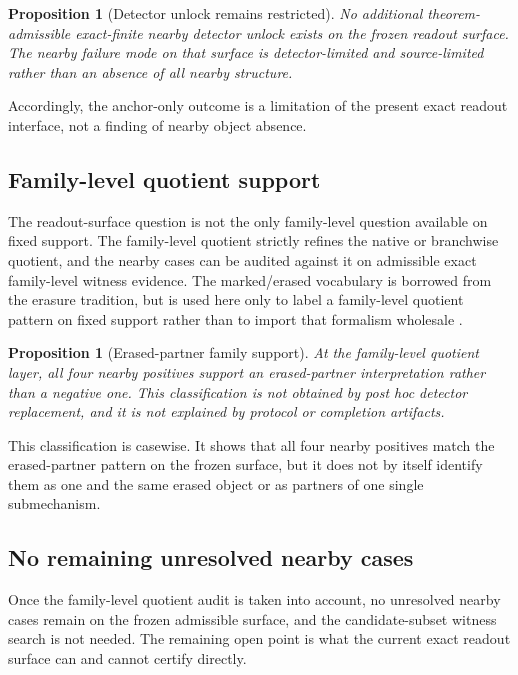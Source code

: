\documentclass[11pt]{article}
\newtheorem{proposition}[theorem]{Proposition}
\theoremstyle{definition}
\begin{document}
\begin{proposition}[Detector unlock remains restricted]
\label{prop:nearby-detector-restricted}
No additional theorem-admissible exact-finite nearby detector unlock exists on the frozen readout surface. The nearby failure mode on that surface is detector-limited and source-limited rather than an absence of all nearby structure.
\end{proposition}

Accordingly, the anchor-only outcome is a limitation of the present exact readout interface, not a finding of nearby object absence.

\subsection{Family-level quotient support}

The readout-surface question is not the only family-level question available on fixed support. The family-level quotient strictly refines the native or branchwise quotient, and the nearby cases can be audited against it on admissible exact family-level witness evidence. The marked/erased vocabulary is borrowed from the erasure tradition, but is used here only to label a family-level quotient pattern on fixed support rather than to import that formalism wholesale \cite{ScullyDruhl1982}.

\begin{proposition}[Erased-partner family support]
\label{prop:nearby-erased-partner}
At the family-level quotient layer, all four nearby positives support an erased-partner interpretation rather than a negative one. This classification is not obtained by post hoc detector replacement, and it is not explained by protocol or completion artifacts.
\end{proposition}

This classification is casewise. It shows that all four nearby positives match the erased-partner pattern on the frozen surface, but it does not by itself identify them as one and the same erased object or as partners of one single submechanism.

\subsection{No remaining unresolved nearby cases}

Once the family-level quotient audit is taken into account, no unresolved nearby cases remain on the frozen admissible surface, and the candidate-subset witness search is not needed. The remaining open point is what the current exact readout surface can and cannot certify directly.
\end{document}
